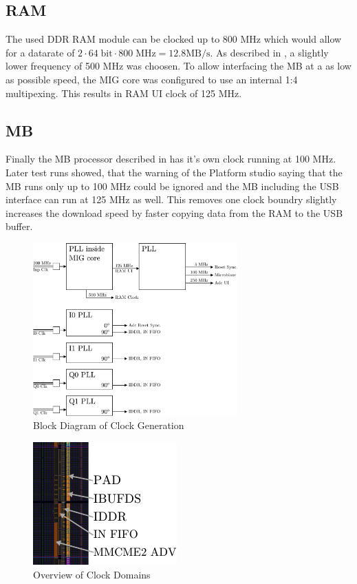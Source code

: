 \subsection{\gls{RAM}}
\label{sec:fpga_clock_ram}
The used \gls{DDR} \gls{RAM} module can be clocked up to 800 MHz which would
allow for a datarate of
$2 \cdot 64\;\text{bit} \cdot 800\;\text{MHz} = 12.8 \text{MB} / \text{s}$.
As described in , a slightly lower frequency of 500 MHz
was choosen. To allow interfacing the \gls{MB} at a as low as possible speed,
the \gls{MIG} core was configured to use an internal 1:4 multipexing. This results
in \gls{RAM} \gls{UI} clock of 125 MHz.

\subsection{\gls{MB}}
Finally the \gls{MB} processor described in  has
it's own clock running at 100 MHz.  \\

Later test runs showed, that the warning of the Platform studio saying that the
\gls{MB} runs only up to 100 MHz could be ignored and the \gls{MB} including
the \gls{USB} interface can run at 125 MHz as well. This removes one clock boundry
slightly increases the download speed by faster copying data from the
\gls{RAM} to the \gls{USB} buffer.

\begin{figure}
  \centering
  \includegraphics[width=0.7\textwidth]{figures/clock_generation}
  \caption{Block Diagram of Clock Generation}
  \label{fig:fpga_clock_generation}
\end{figure}

\begin{figure}
  \centering
  \includegraphics{figures/adc_input_bank}
  \caption{Overview of Clock Domains}
  \label{fig:fpga_clock_domains}
\end{figure}


